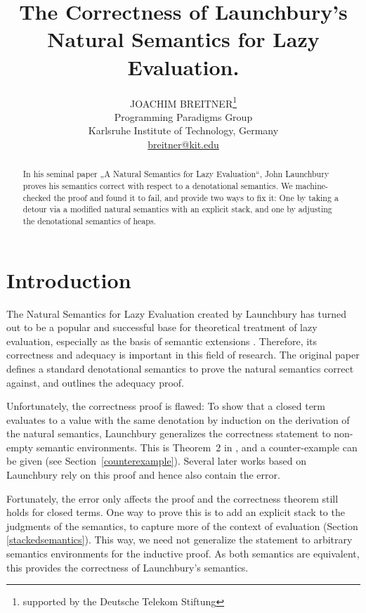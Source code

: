 \documentclass{scrartcl}
\title%
      {The Correctness of Launchbury's Natural Semantics for Lazy Evaluation.}
\author%
        {JOACHIM BREITNER\thanks{supported by the Deutsche Telekom Stiftung}\\
	Programming Paradigms Group\\
         Karlsruhe Institute of Technology, Germany\\
         \url{breitner@kit.edu}}
\theoremstyle{nonumberbreak}
\newcommand{\shortcite}{\cite}
\begin{document}
\label{firstpage}

\maketitle

\begin{abstract}
In his seminal paper „A Natural Semantics for Lazy Evaluation“, John Launchbury
proves his semantics correct with respect to a denotational semantics. We
machine-checked the proof and found it to fail, and provide two ways to fix it:
One by taking a detour via a modified natural semantics with an explicit stack,
and one by adjusting the denotational semantics of heaps.
\end{abstract}

\tableofcontents

\section{Introduction}

The Natural Semantics for Lazy Evaluation created by Launchbury \shortcite{launchbury} has turned out to be a popular and successful base for theoretical treatment of lazy evaluation, especially as the basis of semantic extensions \cite{nakata, nakata_blackhole, distributed, mixed, parallel}. Therefore, its correctness and adequacy is important in this field of research. The original paper defines a standard denotational semantics to prove the natural semantics correct against, and outlines the adequacy proof.

Unfortunately, the correctness proof is flawed: To show that a closed term evaluates to a value with the same denotation by induction on the derivation of the natural semantics, Launchbury generalizes the correctness statement to non-empty semantic environments. This is Theorem~2 in \cite{launchbury}, and a counter-example can be given (see Section~\ref{counterexample}). Several later works based on Launchbury rely on this proof and hence also contain the error.

Fortunately, the error only affects the proof and the correctness theorem still holds for closed terms. One way to prove this is to add an explicit stack to the judgments of the semantics, to capture more of the context of evaluation (Section \ref{stackedsemantics}). This way, we need not generalize the statement to arbitrary semantics environments for the inductive proof. As both semantics are equivalent, this provides the correctness of Launchbury's semantics.
\end{document}
